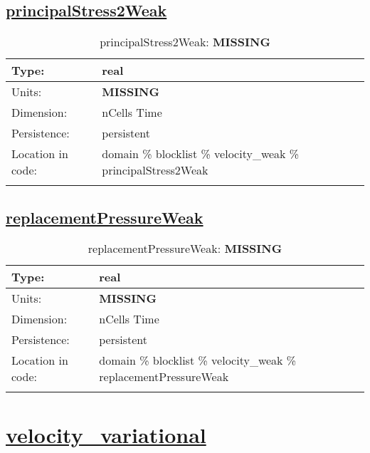 \subsection[principalStress2Weak]{\hyperref[sec:var_tab_velocity_weak]{principalStress2Weak}}
\label{subsec:var_sec_velocity_weak_principalStress2Weak}
\begin{center}
\begin{longtable}{| p{2.0in} | p{4.0in} |}
        \hline 
        Type: & real \\
        \hline 
        Units: & {\bf \color{red} MISSING} \\
        \hline 
        Dimension: & nCells Time \\
        \hline 
        Persistence: & persistent \\
        \hline 
         Location in code: & domain \% blocklist \% velocity\_weak \% principalStress2Weak \\
         \hline 
    \caption{principalStress2Weak: {\bf \color{red} MISSING}}
\end{longtable}
\end{center}
\subsection[replacementPressureWeak]{\hyperref[sec:var_tab_velocity_weak]{replacementPressureWeak}}
\label{subsec:var_sec_velocity_weak_replacementPressureWeak}
\begin{center}
\begin{longtable}{| p{2.0in} | p{4.0in} |}
        \hline 
        Type: & real \\
        \hline 
        Units: & {\bf \color{red} MISSING} \\
        \hline 
        Dimension: & nCells Time \\
        \hline 
        Persistence: & persistent \\
        \hline 
         Location in code: & domain \% blocklist \% velocity\_weak \% replacementPressureWeak \\
         \hline 
    \caption{replacementPressureWeak: {\bf \color{red} MISSING}}
\end{longtable}
\end{center}
\section[velocity\_variational]{\hyperref[sec:var_tab_velocity_variational]{velocity\_variational}}
\label{sec:var_sec_velocity_variational}
